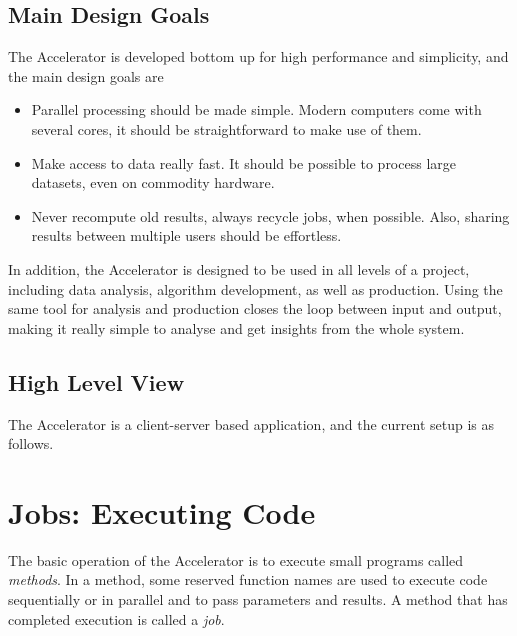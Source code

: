 \documentclass[a4paper]{article}
\begin{document}
\subsection{Main Design Goals}
The Accelerator is developed bottom up for high performance and
simplicity, and the main design goals are
\begin{itemize}
\item[] Parallel processing should be made simple.  Modern computers
  come with several cores, it should be straightforward to make use of
  them.
\item[] Make access to data really fast.  It should be possible to
  process large datasets, even on commodity hardware.
\item[] Never recompute old results, always recycle jobs, when
  possible.  Also, sharing results between multiple users should be
  effortless.
\end{itemize}
In addition, the Accelerator is designed to be used in all levels of a
project, including data analysis, algorithm development, as well as
production.  Using the same tool for analysis and production closes
the loop between input and output, making it really simple to analyse
and get insights from the whole system.

\subsection{High Level View}

The Accelerator is a client-server based application, and the current
setup is as follows.

\begin{figure}[h!]
  \begin{center}
    
    \caption{}
    \label{fig:overview}
  \end{center}
\end{figure}






\clearpage
\section{Jobs:  Executing Code}
The basic operation of the Accelerator is to execute small programs
called \textsl{methods}.  In a method, some reserved function names
are used to execute code sequentially or in parallel and to pass
parameters and results.  A method that has completed execution is
called a \textsl{job}.
\end{document}
